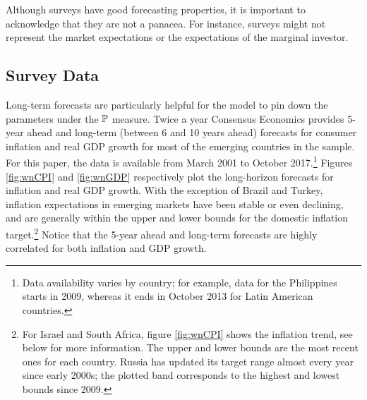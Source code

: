 {Although surveys have good forecasting properties, it is important to acknowledge that they are not a panacea. For instance, surveys might not represent the market expectations or the expectations of the marginal investor.




\subsection{Survey Data} \label{sec:SurveyData}
\iftoggle{toclinks}{\gototoc}{} %

Long-term forecasts are particularly helpful for the model to pin down the parameters under the \(\mathbb{P}\) measure.
Twice a year Consensus Economics provides 5-year ahead and long-term (between 6 and 10 years ahead) forecasts for consumer inflation and real GDP growth for most of the emerging countries in the sample. 
For this paper, the data is available from March 2001 to October 2017.\footnote{ Data availability varies by country; for example, data for the Philippines starts in 2009, whereas it ends in October 2013 for Latin American countries.}
Figures \ref{fig:wnCPI} and \ref{fig:wnGDP} respectively plot the long-horizon forecasts for inflation and real GDP growth.
With the exception of Brazil and Turkey, inflation expectations in emerging markets have been stable or even declining, and are generally within the upper and lower bounds for the domestic inflation target.\footnote{ For Israel and South Africa, figure \ref{fig:wnCPI} shows the inflation trend, see below for more information. The upper and lower bounds are the most recent ones for each country. Russia has updated its target range almost every year since early 2000s; the plotted band corresponds to the highest and lowest bounds since 2009.}
Notice that the 5-year ahead and long-term forecasts are highly correlated for both inflation and GDP growth.

}
